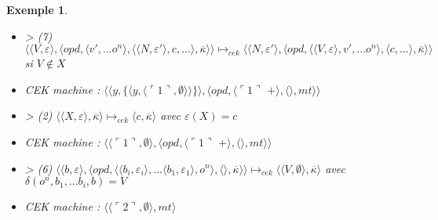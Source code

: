 \documentclass[10pt,a4paper]{report}
\newtheorem{ex}{Exemple}
\begin{document}
\begin{ex}
\begin{itemize}
			\item[] > (7) $\langle \langle V,\varepsilon\rangle,\langle opd,\langle v',...o^{n}\rangle,\langle  \langle N,\varepsilon'\rangle,c,...\rangle,\overline{\kappa}\rangle\rangle \longmapsto_{cek} \langle \langle N,\varepsilon'\rangle,\langle opd,\langle  \langle V,\varepsilon\rangle,v',...o^{n}\rangle,\langle c,...\rangle,\overline{\kappa}\rangle\rangle$ si $V \notin X$
			\item[] CEK machine : $\langle\langle y,\{\langle y,\langle\ulcorner 1\urcorner,\emptyset\rangle\rangle\}\rangle,\langle opd,\langle\ulcorner 1\urcorner$ $+\rangle,\langle\rangle,mt\rangle\rangle$
			\item[] > (2) $\langle\langle X,\varepsilon\rangle,\overline{\kappa}\rangle \longmapsto_{cek} \langle c,\overline{\kappa}\rangle$ avec $\varepsilon(X) = c$
			\item[] CEK machine : $\langle\langle\ulcorner 1\urcorner,\emptyset\rangle,\langle opd,\langle\ulcorner 1\urcorner$ $+\rangle,\langle\rangle,mt\rangle\rangle$
			\item[] > (6) $\langle  \langle b,\varepsilon\rangle,\langle opd,\langle \langle b_{i},\varepsilon_{i}\rangle,...\langle b_{1},\varepsilon_{1}\rangle ,o^{n}\rangle,\langle\rangle,\overline{\kappa}\rangle\rangle \longmapsto_{cek} \langle \langle V,\emptyset\rangle,\overline{\kappa}\rangle$ avec $\delta(o^{n},b_{1},...b_{i},b) = V$
			\item[] CEK machine : $\langle\langle\ulcorner 2\urcorner,\emptyset\rangle,mt\rangle$
		\end{itemize}
	\end{ex}
	\newpage
	
	
	
\end{document}
